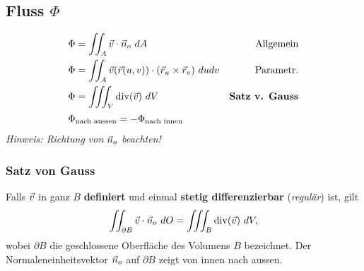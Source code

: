 \subsection{Fluss \texorpdfstring{\hfill $\Phi$}{Phi}}
    \vspace{-1em}
    \begin{align*}
        \Phi &= \iint_A \vec{v} \cdot \vec{n}_o \ dA &\textrm{Allgemein}\\
        \Phi &= \iint_A \vec{v}(\vec{r}(u,v)) \cdot (\vec{r}_u \times \vec{r}_v) \ du dv &\textrm{Parametr.}\\
        \Phi &= \iiint_V \mathrm{div}(\vec{v}) \ dV &\textbf{Satz\ v. Gauss} \\[0.125em]
        \Phi &_{\textrm{nach aussen}} = - \Phi_{\textrm{nach innen}}
    \end{align*} \vskip1pt
    \textit{Hinweis: Richtung von $\vec{n}_o$ beachten!}

    \subsubsection{Satz von Gauss}
        Falls $\vec{v}$ in ganz $B$ \textbf{definiert} und einmal \textbf{stetig differenzierbar} (\textit{regulär}) ist, gilt
        $$
            \iint_{\partial B} \vec{v} \cdot \vec{n}_o \ dO = \iiint_B \mathrm{div}(\vec{v}) \ dV,
        $$
        wobei $\partial B$ die geschlossene Oberfläche des Volumens $B$ bezeichnet.
        Der Normaleneinheitsvektor $\vec{n}_o$ auf $\partial B$ zeigt von innen nach aussen.